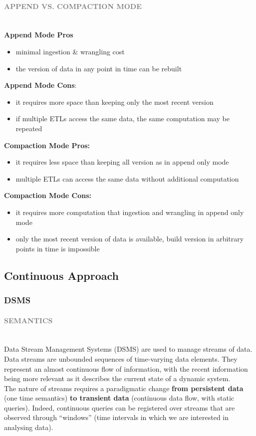 \documentclass[10pt,a4paper]{article}
\newcommand{\myparagraph}[1]{\paragraph{\normalsize{\textcolor{gray}{\uppercase{\textbf{#1}}}} }\mbox{} \vspace{0.5em}\\}
\begin{document}
\myparagraph{Append vs. Compaction Mode}
\textbf{Append Mode Pros}
\begin{itemize}
	\item minimal ingestion \& wrangling cost
	\item the version of data in any point in time can be rebuilt
\end{itemize}
\textbf{Append Mode Cons}:
\begin{itemize}
	\item it requires more space than keeping only the most recent version
	\item if multiple ETLs access the same data, the same computation may be repeated
\end{itemize}
\textbf{Compaction Mode Pros:}
\begin{itemize}
	\item it requires less space than keeping all version as in append only mode
	\item multiple ETLs can access the same data without additional computation
\end{itemize}
\textbf{Compaction Mode Cons:}
\begin{itemize}
	\item it requires more computation that ingestion and wrangling in append only mode
	\item only the most recent version of data is available, build version in arbitrary points in time is impossible
\end{itemize}

\subsection{Continuous Approach}
\subsubsection{DSMS}
\myparagraph{Semantics}
Data Stream Management Systems (DSMS) are used to manage streams of data. Data streams are unbounded sequences of time-varying data elements. They represent an almost continuous flow of information, with the recent information being more relevant as it describes the current state of a dynamic system. \\
The nature of streams requires a paradigmatic change \textbf{from persistent data} (one time semantics) \textbf{to transient data} (continuous data flow, with static queries). Indeed, continuous queries can be registered over streams that are observed through “windows” (time intervals in which we are interested in analysing data).
\end{document}
